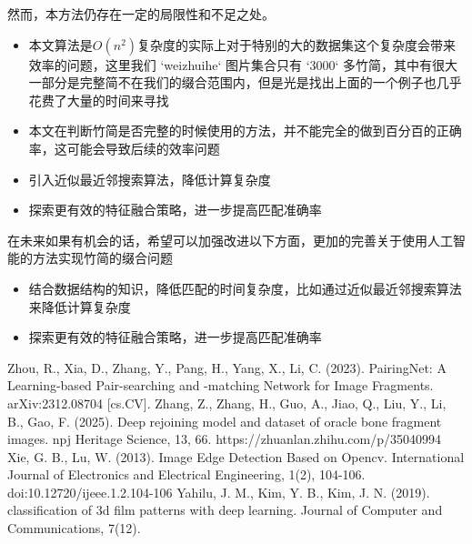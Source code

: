 \documentclass{article}
\begin{document}
然而，本方法仍存在一定的局限性和不足之处。
\begin{itemize}
    \item 本文算法是$O(n^2)$复杂度的实际上对于特别的大的数据集这个复杂度会带来效率的问题，这里我们 `weizhuihe` 图片集合只有 `3000` 多竹简，其中有很大一部分是完整简不在我们的缀合范围内，但是光是找出上面的一个例子也几乎花费了大量的时间来寻找
    \item 本文在判断竹简是否完整的时候使用的方法，并不能完全的做到百分百的正确率，这可能会导致后续的效率问题
    \item 引入近似最近邻搜索算法，降低计算复杂度
    \item 探索更有效的特征融合策略，进一步提高匹配准确率
\end{itemize}

在未来如果有机会的话，希望可以加强改进以下方面，更加的完善关于使用人工智能的方法实现竹简的缀合问题
\begin{itemize}
    \item 结合数据结构的知识，降低匹配的时间复杂度，比如通过近似最近邻搜索算法来降低计算复杂度
    \item 探索更有效的特征融合策略，进一步提高匹配准确率
\end{itemize}


\begin{thebibliography}{99}
 Zhou, R., Xia, D., Zhang, Y., Pang, H., Yang, X., Li, C. (2023). PairingNet: A Learning-based Pair-searching and -matching Network for Image Fragments. arXiv:2312.08704 [cs.CV].
 Zhang, Z., Zhang, H., Guo, A., Jiao, Q., Liu, Y., Li, B., Gao, F. (2025). Deep rejoining model and dataset of oracle bone fragment images. npj Heritage Science, 13, 66.
 https://zhuanlan.zhihu.com/p/35040994
 Xie, G. B., Lu, W. (2013). Image Edge Detection Based on Opencv. International Journal of Electronics and Electrical Engineering, 1(2), 104-106. doi:10.12720/ijeee.1.2.104-106
 Yahilu, J. M., Kim, Y. B., Kim, J. N. (2019). classification of 3d film patterns with deep learning. Journal of Computer and Communications, 7(12).
\end{thebibliography}
\end{document}
